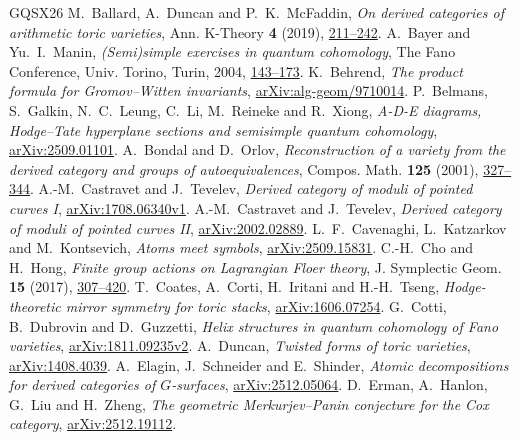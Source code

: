 \begin{thebibliography}{GQSX26}
 M.~Ballard, A.~Duncan and P.~K.~McFaddin, \emph{On derived categories of arithmetic toric varieties}, Ann. K-Theory \textbf{4} (2019), \href{https://msp.org/akt/2019/4-2/akt-v4-n2-p03-p.pdf}{211--242}.
 A.~Bayer and Yu.~I.~Manin, \emph{(Semi)simple exercises in quantum cohomology}, The Fano Conference, Univ. Torino, Turin, 2004, \href{https://arxiv.org/abs/math/0103164}{143--173}.
 K.~Behrend, \emph{The product formula for Gromov--Witten invariants}, \href{https://arxiv.org/abs/alg-geom/9710014}{arXiv:alg-geom/9710014}.
 P.~Belmans, S.~Galkin, N.~C.~Leung, C.~Li, M.~Reineke and R.~Xiong, \emph{A-D-E diagrams, Hodge--Tate hyperplane sections and semisimple quantum cohomology}, \href{https://arxiv.org/abs/2509.01101}{arXiv:2509.01101}.
 A.~Bondal and D.~Orlov, \emph{Reconstruction of a variety from the derived category and groups of autoequivalences}, Compos. Math. \textbf{125} (2001), \href{https://arxiv.org/abs/alg-geom/9712029}{327--344}.
 A.-M.~Castravet and J.~Tevelev, \emph{Derived category of moduli of pointed curves I}, \href{https://arxiv.org/abs/1708.06340v1}{arXiv:1708.06340v1}.
 A.-M.~Castravet and J.~Tevelev, \emph{Derived category of moduli of pointed curves II}, \href{https://arxiv.org/abs/2002.02889}{arXiv:2002.02889}.
 L.~F.~Cavenaghi, L.~Katzarkov and M.~Kontsevich, \emph{Atoms meet symbols}, \href{https://arxiv.org/abs/2509.15831}{arXiv:2509.15831}.
 C.-H.~Cho and H.~Hong, \emph{Finite group actions on Lagrangian Floer theory}, J. Symplectic Geom. \textbf{15} (2017), \href{https://arxiv.org/abs/1307.4573}{307--420}.
 T.~Coates, A.~Corti, H.~Iritani and H.-H.~Tseng, \emph{Hodge-theoretic mirror symmetry for toric stacks}, \href{https://arxiv.org/abs/1606.07254}{arXiv:1606.07254}.
 G.~Cotti, B.~Dubrovin and D.~Guzzetti, \emph{Helix structures in quantum cohomology of Fano varieties}, \href{https://arxiv.org/abs/1811.09235v2}{arXiv:1811.09235v2}.
 A.~Duncan, \emph{Twisted forms of toric varieties}, \href{https://arxiv.org/abs/1408.4039}{arXiv:1408.4039}.
 A.~Elagin, J.~Schneider and E.~Shinder, \emph{Atomic decompositions for derived categories of $G$-surfaces}, \href{https://arxiv.org/abs/2512.05064}{arXiv:2512.05064}.
 D.~Erman, A.~Hanlon, G.~Liu and H.~Zheng, \emph{The geometric Merkurjev--Panin conjecture for the Cox category}, \href{https://arxiv.org/abs/2512.19112}{arXiv:2512.19112}.

\end{thebibliography}
